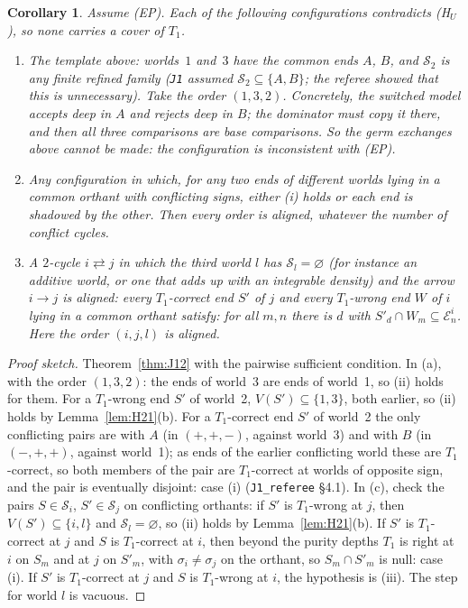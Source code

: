 \documentclass[11pt]{article}
\newtheorem{corollary}[theorem]{Corollary}
\theoremstyle{definition}
\theoremstyle{remark}
\newcommand{\src}[1]{\texttt{#1}}
\begin{document}
\begin{corollary}\label{cor:J13}
Assume (EP). Each of the following configurations contradicts (H$_U$), so none carries a cover of $T_1$.
\begin{enumerate}[leftmargin=*,label=(\alph*)]
\item The template above: worlds~$1$ and~$3$ have the common ends $A$, $B$, and $\mathcal S_2$ is any finite refined family (\src{J1} assumed $\mathcal S_2\subseteq\{A,B\}$; the referee showed that this is unnecessary). Take the order $(1,3,2)$. Concretely, the switched model accepts deep in $A$ and rejects deep in $B$; the dominator must copy it there, and then all three comparisons are base comparisons. So the germ exchanges above cannot be made: the configuration is inconsistent with (EP).
\item Any configuration in which, for any two ends of different worlds lying in a common orthant with conflicting signs, either (i) holds or each end is shadowed by the other. Then every order is aligned, whatever the number of conflict cycles.
\item A $2$-cycle $i\rightleftarrows j$ in which the third world $l$ has $\mathcal S_l=\varnothing$ (for instance an additive world, or one that adds up with an integrable density) and the arrow $i\to j$ is \emph{aligned}: every $T_1$-correct end $S'$ of $j$ and every $T_1$-wrong end $W$ of $i$ lying in a common orthant satisfy: for all $m,n$ there is $d$ with $S'_d\cap W_m\subseteq\mathcal E^i_n$. Here the order $(i,j,l)$ is aligned.
\end{enumerate}
\end{corollary}
\begin{proof}[Proof sketch]
Theorem~\ref{thm:J12} with the pairwise sufficient condition. In (a), with the order $(1,3,2)$: the ends of world~3 are ends of world~1, so (ii) holds for them. For a $T_1$-wrong end $S'$ of world~2, $V(S')\subseteq\{1,3\}$, both earlier, so (ii) holds by Lemma~\ref{lem:H21}(b). For a $T_1$-correct end $S'$ of world~2 the only conflicting pairs are with $A$ (in $(+,+,-)$, against world~3) and with $B$ (in $(-,+,+)$, against world~1); as ends of the earlier conflicting world these are $T_1$-correct, so both members of the pair are $T_1$-correct at worlds of opposite sign, and the pair is eventually disjoint: case (i) (\src{J1\_referee} \S4.1). In (c), check the pairs $S\in\mathcal S_i$, $S'\in\mathcal S_j$ on conflicting orthants: if $S'$ is $T_1$-wrong at $j$, then $V(S')\subseteq\{i,l\}$ and $\mathcal S_l=\varnothing$, so (ii) holds by Lemma~\ref{lem:H21}(b). If $S'$ is $T_1$-correct at $j$ and $S$ is $T_1$-correct at $i$, then beyond the purity depths $T_1$ is right at $i$ on $S_m$ and at $j$ on $S'_m$, with $\sigma_i\ne\sigma_j$ on the orthant, so $S_m\cap S'_m$ is null: case (i). If $S'$ is $T_1$-correct at $j$ and $S$ is $T_1$-wrong at $i$, the hypothesis is (iii). The step for world $l$ is vacuous.
\end{proof}
\end{document}
